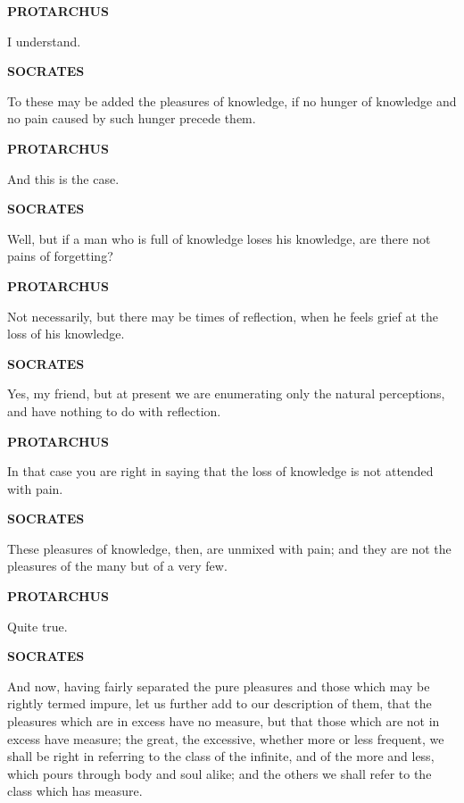 \documentclass[11pt,letter]{article}
\begin{document}
\par \textbf{PROTARCHUS}
\par   I understand.

\par \textbf{SOCRATES}
\par   To these may be added the pleasures of knowledge, if no hunger of knowledge and no pain caused by such hunger precede them.

\par \textbf{PROTARCHUS}
\par   And this is the case.

\par \textbf{SOCRATES}
\par   Well, but if a man who is full of knowledge loses his knowledge, are there not pains of forgetting?

\par \textbf{PROTARCHUS}
\par   Not necessarily, but there may be times of reflection, when he feels grief at the loss of his knowledge.

\par \textbf{SOCRATES}
\par   Yes, my friend, but at present we are enumerating only the natural perceptions, and have nothing to do with reflection.

\par \textbf{PROTARCHUS}
\par   In that case you are right in saying that the loss of knowledge is not attended with pain.

\par \textbf{SOCRATES}
\par   These pleasures of knowledge, then, are unmixed with pain; and they are not the pleasures of the many but of a very few.

\par \textbf{PROTARCHUS}
\par   Quite true.

\par \textbf{SOCRATES}
\par   And now, having fairly separated the pure pleasures and those which may be rightly termed impure, let us further add to our description of them, that the pleasures which are in excess have no measure, but that those which are not in excess have measure; the great, the excessive, whether more or less frequent, we shall be right in referring to the class of the infinite, and of the more and less, which pours through body and soul alike; and the others we shall refer to the class which has measure.
\end{document}

